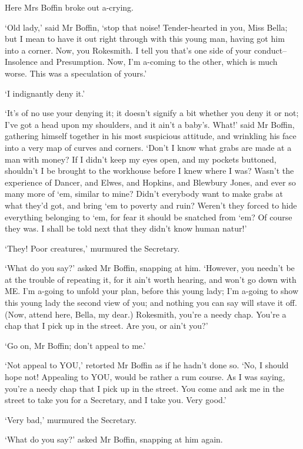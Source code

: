 Here Mrs Boffin broke out a-crying.

‘Old lady,’ said Mr Boffin, ‘stop that noise! Tender-hearted in you,
Miss Bella; but I mean to have it out right through with this young man,
having got him into a corner. Now, you Rokesmith. I tell you that’s one
side of your conduct--Insolence and Presumption. Now, I’m a-coming to
the other, which is much worse. This was a speculation of yours.’

‘I indignantly deny it.’

‘It’s of no use your denying it; it doesn’t signify a bit whether
you deny it or not; I’ve got a head upon my shoulders, and it ain’t a
baby’s. What!’ said Mr Boffin, gathering himself together in his most
suspicious attitude, and wrinkling his face into a very map of curves
and corners. ‘Don’t I know what grabs are made at a man with money? If
I didn’t keep my eyes open, and my pockets buttoned, shouldn’t I
be brought to the workhouse before I knew where I was? Wasn’t the
experience of Dancer, and Elwes, and Hopkins, and Blewbury Jones, and
ever so many more of ‘em, similar to mine? Didn’t everybody want to make
grabs at what they’d got, and bring ‘em to poverty and ruin? Weren’t
they forced to hide everything belonging to ‘em, for fear it should be
snatched from ‘em? Of course they was. I shall be told next that they
didn’t know human natur!’

‘They! Poor creatures,’ murmured the Secretary.

‘What do you say?’ asked Mr Boffin, snapping at him. ‘However, you
needn’t be at the trouble of repeating it, for it ain’t worth hearing,
and won’t go down with ME. I’m a-going to unfold your plan, before this
young lady; I’m a-going to show this young lady the second view of you;
and nothing you can say will stave it off. (Now, attend here, Bella, my
dear.) Rokesmith, you’re a needy chap. You’re a chap that I pick up in
the street. Are you, or ain’t you?’

‘Go on, Mr Boffin; don’t appeal to me.’

‘Not appeal to YOU,’ retorted Mr Boffin as if he hadn’t done so. ‘No,
I should hope not! Appealing to YOU, would be rather a rum course. As I
was saying, you’re a needy chap that I pick up in the street. You come
and ask me in the street to take you for a Secretary, and I take you.
Very good.’

‘Very bad,’ murmured the Secretary.

‘What do you say?’ asked Mr Boffin, snapping at him again.

